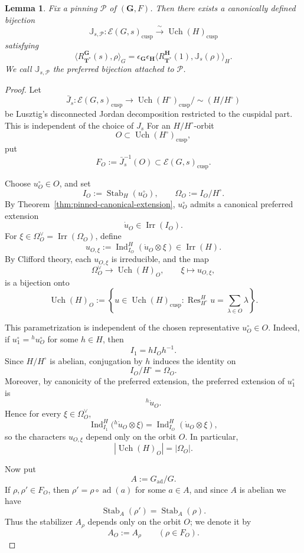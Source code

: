 \documentclass{amsart}
\theoremstyle{plain}
\numberwithin{equation}{section}
\newtheorem{lemma}[theorem]{Lemma}
\theoremstyle{definition}
\newcommand{\cP}{\mathcal{P}}
\newcommand{\cE}{\mathcal{E}}
\newcommand{\Ind}{\operatorname{Ind}}
\newcommand{\Res}{\operatorname{Res}}
\newcommand{\Irr}{\operatorname{Irr}}
\newcommand{\Uch}{\operatorname{Uch}}
\newcommand{\J}{\mathbb{J}}
\newcommand{\Stab}{\operatorname{Stab}}
\newcommand{\ad}{\operatorname{ad}}
\newcommand{\cusp}{\operatorname{cusp}}
\newcommand{\bG}{\mathbf{G}}
\newcommand{\bT}{\mathbf{T}}
\newcommand{\bH}{\mathbf{H}}
\begin{document}
\begin{lemma}\label{lemma:bijection-cuspidal}
Fix a pinning \(\cP\) of \((\bG,F)\). Then there exists a canonically defined bijection
\[
\J_{s,\cP}:\cE(G,s)_{\cusp}\xrightarrow{\ \sim\ }\Uch(H)_{\cusp}
\]
satisfying
\[
\langle R_{\bT^{*}}^{\bG}(s), \rho \rangle_G = \epsilon_{\bG} \epsilon_{\bH} \langle R_{\bT^{*}}^{\bH}(1), \J_s(\rho) \rangle_H.
\]
We call \(\J_{s,\cP}\) the preferred bijection attached to \(\cP\).
\end{lemma}
\begin{proof}
Let
\[
\bar J_s:\cE(G,s)_{\cusp}\longrightarrow
\Uch(H^\circ)_{\cusp}/\!\sim(H/H^\circ)
\]
be Lusztig's disconnected Jordan decomposition restricted to the cuspidal part. This is independent of the choice of $J_s$
For an \(H/H^\circ\)-orbit
\[
O\subset \Uch(H^\circ)_{\cusp},
\]
put
\[
F_O:=\bar J_s^{-1}(O)\subset \cE(G,s)_{\cusp}.
\]

Choose \(u_O^\circ\in O\), and set
\[
I_O:=\Stab_H(u_O^\circ),\qquad \Omega_O:=I_O/H^\circ .
\]
By Theorem~\ref{thm:pinned-canonical-extension}, \(u_O^\circ\) admits a canonical preferred
extension
\[
\dot u_O\in \Irr(I_O).
\]
For \(\xi\in \Omega_O^\vee=\Irr(\Omega_O)\), define
\[
u_{O,\xi}:=\Ind_{I_O}^H(\dot u_O\otimes \xi)\in \Irr(H).
\]
By Clifford theory, each \(u_{O,\xi}\) is irreducible, and the map
\[
\Omega_O^\vee\longrightarrow \Uch(H)_O,\qquad
\xi\longmapsto u_{O,\xi},
\]
is a bijection onto
\[
\Uch(H)_O:=
\left\{
u\in \Uch(H)_{\cusp}:\Res^H_{H^\circ}u=\sum_{\lambda\in O}\lambda
\right\}.
\]

This parametrization is independent of the chosen representative \(u_O^\circ\in O\).
Indeed, if \(u_1^\circ={}^h u_O^\circ\) for some \(h\in H\), then
\[
I_1=hI_Oh^{-1}.
\]
Since \(H/H^\circ\) is abelian, conjugation by \(h\) induces the identity on
\[
I_O/H^\circ=\Omega_O.
\]
Moreover, by canonicity of the preferred extension, the preferred extension of \(u_1^\circ\) is
\[
{}^h\!\dot u_O.
\]
Hence for every \(\xi\in \Omega_O^\vee\),
\[
\Ind_{I_1}^H\bigl({}^h\!\dot u_O\otimes \xi\bigr)
=
\Ind_{I_O}^H(\dot u_O\otimes \xi),
\]
so the characters \(u_{O,\xi}\) depend only on the orbit \(O\). In particular,
\begin{equation}\label{eq:HO-torsor-rewrite}
|\Uch(H)_O|=|\Omega_O|.
\end{equation}

Now put
\[
A:=G_{\ad}/G.
\]
If \(\rho,\rho'\in F_O\), then \(\rho'=\rho\circ \ad(a)\) for some \(a\in A\), and since \(A\) is
abelian we have
\[
\Stab_A(\rho')=\Stab_A(\rho).
\]
Thus the stabilizer \(A_\rho\) depends only on the orbit \(O\); we denote it by
\[
A_O:=A_\rho\qquad (\rho\in F_O).
\]


\end{proof}
\end{document}
